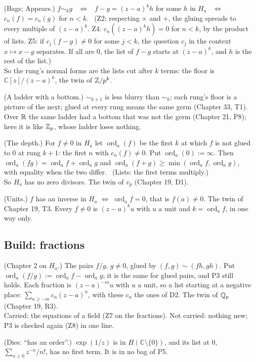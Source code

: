 \begin{lines}
\item[\lab{P1}] (Bags; Appears.) $f \sim_k g$ \ $\iff$ \ $f - g = (z - a)^k h$ for some $h$ in $H_a$ \ $\iff$ \ $c_n(f) = c_n(g)$ for $n < k$. \ (Z2: respecting $\times$ and $+$, the gluing spreads to every multiple of $(z - a)^k$. Z4: $c_n((z - a)^k h) = 0$ for $n < k$, by the product of lists. Z5: if $c_j(f - g) \ne 0$ for some $j < k$, the question $c_j$ in the context $x \mapsto x - g$ separates. If all are $0$, the list of $f - g$ starts at $(z - a)^k$, and $h$ is the rest of the list.) \\
So the rung's normal forms are the lists cut after $k$ terms: the floor is $\mathbb{C}[z]/(z - a)^k$, the twin of $\mathbb{Z}/p^k$.
\item[\lab{P2}] (A ladder with a bottom.) $\sim_{k+1}$ is less blurry than $\sim_k$; each rung's floor is a picture of the next; glued at every rung means the same germ (Chapter 33, T1). Over $\mathbb{R}$ the same ladder had a bottom that was not the germ (Chapter 21, P8); here it is like $\mathbb{Z}_p$, whose ladder loses nothing.
\item[\lab{P3}] (The depth.) For $f \ne 0$ in $H_a$ let $\operatorname{ord}_a(f)$ be the first $k$ at which $f$ is not glued to $0$ at rung $k + 1$: the first $n$ with $c_n(f) \ne 0$. Put $\operatorname{ord}_a(0) := \infty$. Then $\operatorname{ord}_a(fg) = \operatorname{ord}_a f + \operatorname{ord}_a g$ and $\operatorname{ord}_a(f + g) \ge \min(\operatorname{ord}_a f, \operatorname{ord}_a g)$, with equality when the two differ. \ (Lists: the first terms multiply.) \\
So $H_a$ has no zero divisors. The twin of $v_p$ (Chapter 19, D1).
\item[\lab{P4}] (Units.) $f$ has an inverse in $H_a$ $\iff$ $\operatorname{ord}_a f = 0$, that is $f(a) \ne 0$. The twin of Chapter 19, T3. Every $f \ne 0$ is $(z - a)^k u$ with $u$ a unit and $k = \operatorname{ord}_a f$, in one way only.
\end{lines}

\subsection*{Build: fractions}

\begin{lines}
\item[\lab{P5}] (Chapter 2 on $H_a$.) The pairs $f/g$, $g \ne 0$, glued by $(f, g) \sim (fh, gh)$. Put $\operatorname{ord}_a(f/g) := \operatorname{ord}_a f - \operatorname{ord}_a g$; it is the same for glued pairs, and P3 still holds. Each fraction is $(z - a)^{-m} u$ with $u$ a unit, so a list starting at a negative place: $\sum_{n \ge -m} c_n (z - a)^n$, with these $c_n$ the ones of D2. The twin of $\mathbb{Q}_p$ (Chapter 19, R3). \\
Carried: the equations of a field (Z7 on the fractions). Not carried: nothing new; P3 is checked again (Z8) in one line.
\item[\lab{P6}] (Dies: ``has an order''.) $\exp(1/z)$ is in $H(\mathbb{C} \setminus \{0\})$, and its list at $0$, $\sum_{n \ge 0} z^{-n}/n!$, has no first term. It is in no bag of P5.
\end{lines}

